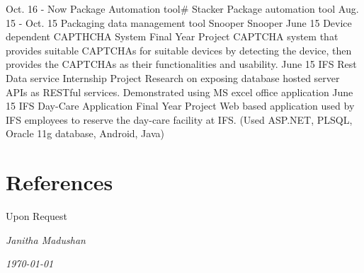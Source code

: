 \documentclass[]{cv-class}
\begin{document}
\newpage

\begin{aside}
\end{aside}

\begin{entrylist}
  \entry
    {Oct. 16 - Now}
    {Package Automation tool\#}
    {Stacker}
    {Package automation tool}
  \entry
    {Aug. 15 - Oct. 15}
    {Packaging data management tool}
    {Snooper}
    {Snooper}
  \entry
    {June 15}
    {Device dependent CAPTHCHA System}
    {Final Year Project}
    {CAPTCHA system that provides suitable CAPTCHAs for suitable devices
	by  detecting  the  device,  then  provides  the  CAPTCHAs  as  their 
	functionalities and usability.}
  \entry
    {June 15}
    {IFS Rest Data service}
    {Internship Project}
    {Research on exposing database hosted server  APIs  as  RESTful  services. 
	Demonstrated  using  MS  excel  office  application}
  \entry
    {June 15}
    {IFS Day-Care Application}
    {Final Year Project}
    {Web  based  application  used  by  IFS  employees  to  reserve  the  day-care 
	facility at IFS. (Used ASP.NET, PLSQL, Oracle 11g database, Android, 
	Java)}
\end{entrylist}

\section{References}
\begin{entrylist}
  \entry
    {}
    {}
    {}
    {Upon Request}
\end{entrylist}


\vspace{1.5cm}
\begin{flushright}
\emph{Janitha Madushan}
\end{flushright}
\begin{flushright}
\emph{\today}
\end{flushright}
\end{document}
